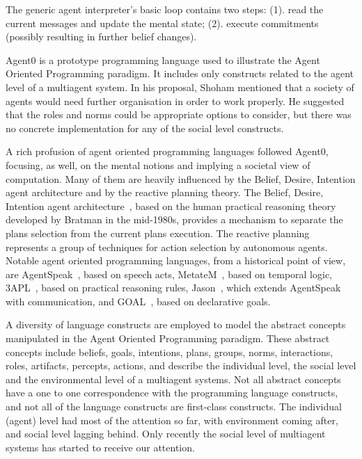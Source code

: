 \documentclass[a4paper,12pt,oneside,fleqn]{book} %
\begin{document}
The generic agent interpreter's basic loop contains two steps: (1). read
the current messages and update the mental state; (2). execute commitments
(possibly resulting in further belief changes).

Agent0 is a prototype programming language used to illustrate the Agent
Oriented Programming paradigm. It includes only constructs related to the
agent level of a multiagent system. In his proposal, Shoham mentioned that
a society of agents would need further organisation in order to work
properly. He suggested that the roles and norms could be appropriate
options to consider, but there was no concrete implementation for any of
the social level constructs.

A rich profusion of agent oriented programming languages followed Agent0,
focusing, as well, on the mental notions and implying a societal view of
computation.  Many of them are heavily influenced by the Belief, Desire,
Intention agent architecture and by the reactive planning theory.  The
Belief, Desire, Intention agent architecture~\cite{DBLP:conf/icmas/RaoG95},
based on the human practical reasoning theory developed by Bratman in the
mid-1980s, provides a mechanism to separate the plans selection from the
current plans execution.  The reactive
planning~\cite{DBLP:conf/aaai/GeorgeffL87} represents a group of techniques
for action selection by autonomous agents.  Notable agent oriented
programming languages, from a historical point of view, are
AgentSpeak~\cite{DBLP:conf/maamaw/Rao96}, based on speech acts,
MetateM~\cite{DBLP:conf/promas/Fisher05}, based on temporal logic,
3APL~\cite{DBLP:conf/promas/DastaniRDM03}, based on practical reasoning
rules, Jason~\cite{DBLP:books/sp/map2005/BordiniHV05}, which extends
AgentSpeak with communication, and
GOAL~\cite{DBLP:journals/corr/cs-AI-0207008}, based on declarative goals.

A diversity of language constructs are employed to model the abstract
concepts manipulated in the Agent Oriented Programming paradigm. These
abstract concepts include beliefs, goals, intentions, plans, groups, norms,
interactions, roles, artifacts, percepts, actions, and describe the
individual level, the social level and the environmental level of a
multiagent systems. Not all abstract concepts have a one to one
correspondence with the programming language constructs, and not all of the
language constructs are first-class constructs. The individual (agent) level
had most of the attention so far, with environment coming after, and social
level lagging behind. Only recently the social level of multiagent systems
has started to receive our attention.
\end{document}
